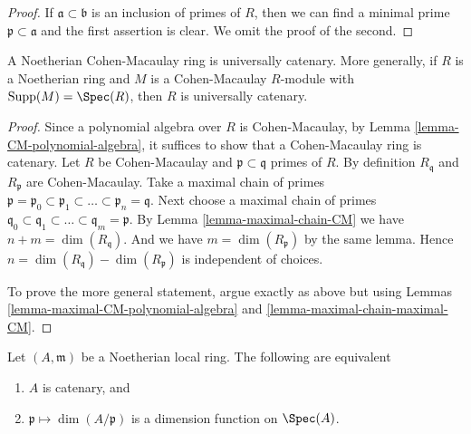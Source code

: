\begin{proof}
If $\mathfrak a \subset \mathfrak b$ is an inclusion of primes of $R$,
then we can find a minimal prime $\mathfrak p \subset \mathfrak a$
and the first assertion is clear. We omit the proof of the second.
\end{proof}

\begin{lemma}
\label{lemma-CM-ring-catenary}
A Noetherian Cohen-Macaulay ring is universally catenary.
More generally, if $R$ is a Noetherian ring and $M$ is
a Cohen-Macaulay $R$-module with $\text{Supp}(M) = \Spec(R)$,
then $R$ is universally catenary.
\end{lemma}

\begin{proof}
Since a polynomial algebra over $R$ is Cohen-Macaulay,
by Lemma \ref{lemma-CM-polynomial-algebra},
it suffices to show that a Cohen-Macaulay ring is
catenary.
Let $R$ be Cohen-Macaulay and $\mathfrak p \subset \mathfrak q$
primes of $R$. By definition $R_{\mathfrak q}$ and
$R_{\mathfrak p}$ are Cohen-Macaulay.
Take a maximal chain of primes
$\mathfrak p = \mathfrak p_0 \subset \mathfrak p_1 \subset
\ldots \subset \mathfrak p_n = \mathfrak q$.
Next choose a maximal chain of primes
$\mathfrak q_0 \subset \mathfrak q_1 \subset \ldots \subset
\mathfrak q_m = \mathfrak p$. By
Lemma \ref{lemma-maximal-chain-CM}
we have $n + m = \dim(R_{\mathfrak q})$. And we have
$m = \dim(R_{\mathfrak p})$ by the same lemma.
Hence $n = \dim(R_{\mathfrak q}) - \dim(R_{\mathfrak p})$
is independent of choices.

\medskip\noindent
To prove the more general statement, argue exactly as above but
using Lemmas \ref{lemma-maximal-CM-polynomial-algebra}
and \ref{lemma-maximal-chain-maximal-CM}.
\end{proof}

\begin{lemma}
\label{lemma-catenary-Noetherian-local}
Let $(A, \mathfrak m)$ be a Noetherian local ring. The following are equivalent
\begin{enumerate}
\item $A$ is catenary, and
\item $\mathfrak p \mapsto \dim(A/\mathfrak p)$ is a dimension function
on $\Spec(A)$.
\end{enumerate}
\end{lemma}

